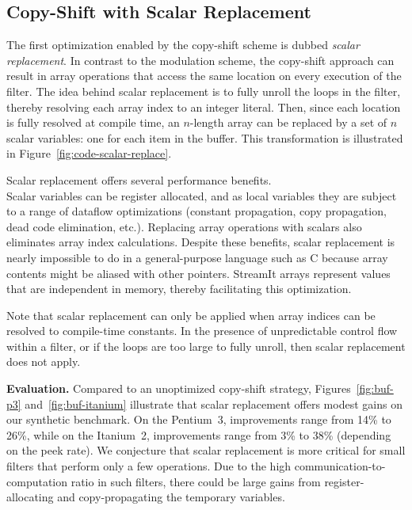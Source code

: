\subsection{Copy-Shift with Scalar Replacement}
\label{sec:scalar-replacement}

The first optimization enabled by the copy-shift scheme is dubbed {\it
scalar replacement}.  In contrast to the modulation scheme, the
copy-shift approach can result in array operations that access the
same location on every execution of the filter.  The idea behind
scalar replacement is to fully unroll the loops in the filter, thereby
resolving each array index to an integer literal.  Then, since each
location is fully resolved at compile time, an $n$-length array can be
replaced by a set of $n$ scalar variables: one for each item in the
buffer.  This transformation is illustrated in
Figure~\ref{fig:code-scalar-replace}.

Scalar replacement offers several performance benefits.\\ Scalar
variables can be register allocated, and as local variables they are
subject to a range of dataflow optimizations (constant propagation,
copy propagation, dead code elimination, etc.).  Replacing array
operations with scalars also eliminates array index calculations.
Despite these benefits, scalar replacement is nearly impossible to do
in a general-purpose language such as C because array contents might
be aliased with other pointers.  StreamIt arrays represent values that
are independent in memory, thereby facilitating this optimization.

Note that scalar replacement can only be applied when array indices
can be resolved to compile-time constants.  In the presence of unpredictable
control flow within a filter, or if the loops are too large to fully unroll,
then scalar replacement does not apply.

{\bf Evaluation.}  Compared to an unoptimized copy-shift strategy,
Figures~\ref{fig:buf-p3} and~\ref{fig:buf-itanium} illustrate that
scalar replacement offers modest gains on our synthetic benchmark.  On
the Pentium~3, improvements range from 14\% to 26\%, while on the
Itanium~2, improvements range from 3\% to 38\% (depending on the peek
rate).  We conjecture that scalar replacement is more critical for
small filters that perform only a few operations.  Due to the high
communication-to-computation ratio in such filters, there could be
large gains from register-allocating and copy-propagating the
temporary variables.

